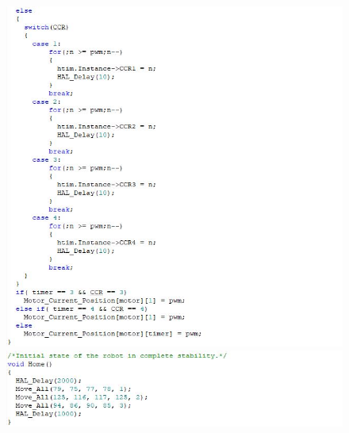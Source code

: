 	\begin{figure}[!h]
	\centering
	\includegraphics[width=\columnwidth]{./Images/Appendix/IMG_9.JPG}
			
	\vspace{0.5cm}
	\includegraphics[width=\columnwidth]{./Images/Appendix/IMG_10.JPG}
	\end{figure}
	
